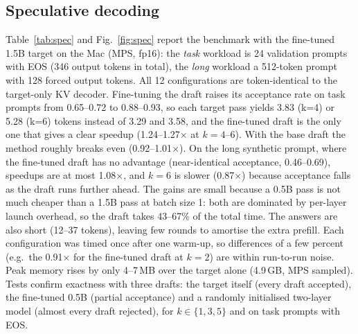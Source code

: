 \documentclass[conference]{IEEEtran}
\begin{document}
\subsection{Speculative decoding}
Table~\ref{tab:spec} and Fig.~\ref{fig:spec} report the benchmark with the fine-tuned 1.5B target on the Mac (MPS, fp16): the \emph{task} workload is 24 validation prompts with EOS (346 output tokens in total), the \emph{long} workload a 512-token prompt with 128 forced output tokens. All 12 configurations are token-identical to the target-only KV decoder. Fine-tuning the draft raises its acceptance rate on task prompts from 0.65--0.72 to 0.88--0.93, so each target pass yields 3.83 (k=4) or 5.28 (k=6) tokens instead of 3.29 and 3.58, and the fine-tuned draft is the only one that gives a clear speedup (1.24--1.27$\times$ at $k=4$--6). With the base draft the method roughly breaks even (0.92--1.01$\times$). On the long synthetic prompt, where the fine-tuned draft has no advantage (near-identical acceptance, 0.46--0.69), speedups are at most 1.08$\times$, and $k=6$ is slower (0.87$\times$) because acceptance falls as the draft runs further ahead. The gains are small because a 0.5B pass is not much cheaper than a 1.5B pass at batch size 1: both are dominated by per-layer launch overhead, so the draft takes 43--67\% of the total time. The answers are also short (12--37 tokens), leaving few rounds to amortise the extra prefill. Each configuration was timed once after one warm-up, so differences of a few percent (e.g.\ the 0.91$\times$ for the fine-tuned draft at $k=2$) are within run-to-run noise. Peak memory rises by only 4--7\,MB over the target alone (4.9\,GB, MPS sampled). Tests confirm exactness with three drafts: the target itself (every draft accepted), the fine-tuned 0.5B (partial acceptance) and a randomly initialised two-layer model (almost every draft rejected), for $k\in\{1,3,5\}$ and on task prompts with EOS.
\end{document}
